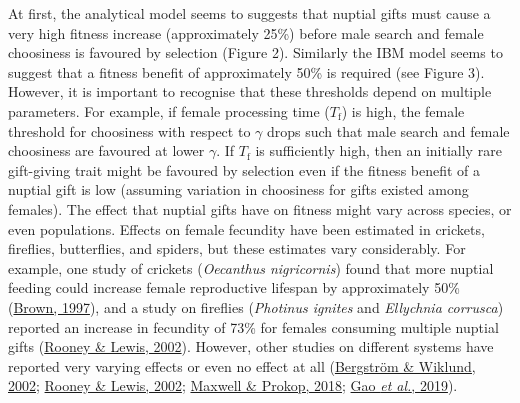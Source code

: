 \documentclass[
]{article}
\begin{document}
At first, the analytical model seems to suggests that nuptial gifts must
cause a very high fitness increase (approximately 25\%) before male
search and female choosiness is favoured by selection (Figure 2).
Similarly the IBM model seems to suggest that a fitness benefit of
approximately 50\% is required (see Figure 3). However, it is important
to recognise that these thresholds depend on multiple parameters. For
example, if female processing time (\(T_{\mathrm{f}}\)) is high, the
female threshold for choosiness with respect to \(\gamma\) drops such
that male search and female choosiness are favoured at lower \(\gamma\).
If \(T_{\mathrm{f}}\) is sufficiently high, then an initially rare
gift-giving trait might be favoured by selection even if the fitness
benefit of a nuptial gift is low (assuming variation in choosiness for
gifts existed among females). The effect that nuptial gifts have on
fitness might vary across species, or even populations. Effects on
female fecundity have been estimated in crickets, fireflies,
butterflies, and spiders, but these estimates vary considerably. For
example, one study of crickets (\emph{Oecanthus nigricornis}) found that
more nuptial feeding could increase female reproductive lifespan by
approximately 50\% (\protect\hyperlink{ref-Brown1997}{Brown, 1997}), and
a study on fireflies (\emph{Photinus ignites} and \emph{Ellychnia
corrusca}) reported an increase in fecundity of 73\% for females
consuming multiple nuptial gifts
(\protect\hyperlink{ref-Rooney2002}{Rooney \& Lewis, 2002}). However,
other studies on different systems have reported very varying effects or
even no effect at all (\protect\hyperlink{ref-Bergstrom2002}{Bergström
\& Wiklund, 2002}; \protect\hyperlink{ref-Rooney2002}{Rooney \& Lewis,
2002}; \protect\hyperlink{ref-Maxwell2018}{Maxwell \& Prokop, 2018};
\protect\hyperlink{ref-Gao2019}{Gao \emph{et al.}, 2019}).
\end{document}
